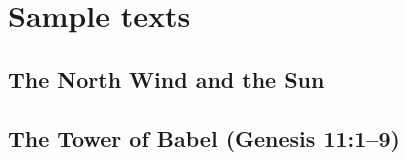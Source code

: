 \part{Sample texts}

\chapter{The North Wind and the Sun}

\chapter{The Tower of Babel (Genesis 11:1--9)}
